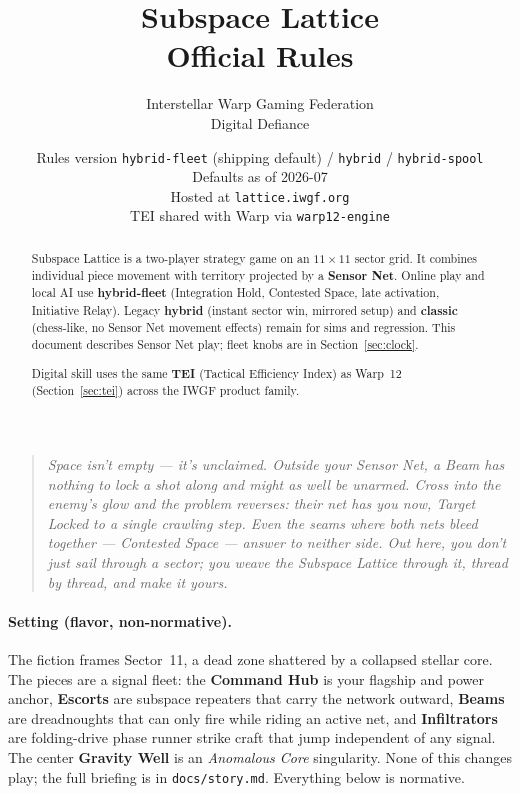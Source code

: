 \documentclass[11pt,a4paper]{article}
\title{Subspace Lattice\\[0.4em]\large Official Rules}
\author{Interstellar Warp Gaming Federation \\ Digital Defiance}
\date{Rules version \texttt{hybrid-fleet} (shipping default) / \texttt{hybrid} / \texttt{hybrid-spool} \\
Defaults as of 2026-07 \\ Hosted at \texttt{lattice.iwgf.org} \\
TEI shared with Warp via \texttt{warp12-engine}}
\begin{document}
\maketitle

\begin{quote}
\itshape
Space isn't empty --- it's unclaimed. Outside your Sensor Net, a Beam has
nothing to lock a shot along and might as well be unarmed. Cross into the
enemy's glow and the problem reverses: their net has you now, Target Locked to
a single crawling step. Even the seams where both nets bleed together ---
Contested Space --- answer to neither side. Out here, you don't just sail
through a sector; you weave the Subspace Lattice through it, thread by thread,
and make it yours.
\end{quote}

\paragraph{Setting (flavor, non-normative).}
The fiction frames Sector~11, a dead zone shattered by a collapsed stellar
core. The pieces are a signal fleet: the \textbf{Command Hub} is your
flagship and power anchor, \textbf{Escorts} are subspace repeaters that carry the
network outward, \textbf{Beams} are dreadnoughts that can only fire while
riding an active net, and \textbf{Infiltrators} are folding-drive phase runner 
strike craft that jump independent of any signal. The center \textbf{Gravity Well} 
is an \emph{Anomalous Core} singularity. None of this changes play; the full
briefing is in \texttt{docs/story.md}. Everything below is normative.

\begin{abstract}
\noindent
Subspace Lattice is a two-player strategy game on an $11\times 11$ sector grid.
It combines individual piece movement with territory projected by a
\textbf{Sensor Net}. Online play and local AI use
\textbf{hybrid-fleet} (Integration Hold, Contested Space, late activation,
Initiative Relay). Legacy \textbf{hybrid} (instant sector win, mirrored
setup) and \textbf{classic} (chess-like, no Sensor Net movement effects)
remain for sims and regression. This document describes Sensor Net play;
fleet knobs are in Section~\ref{sec:clock}.

Digital skill uses the same \textbf{TEI} (Tactical Efficiency Index) as
Warp~12 (Section~\ref{sec:tei}) across the IWGF product family.
\end{abstract}

\tableofcontents
\vspace{1em}
\end{document}

